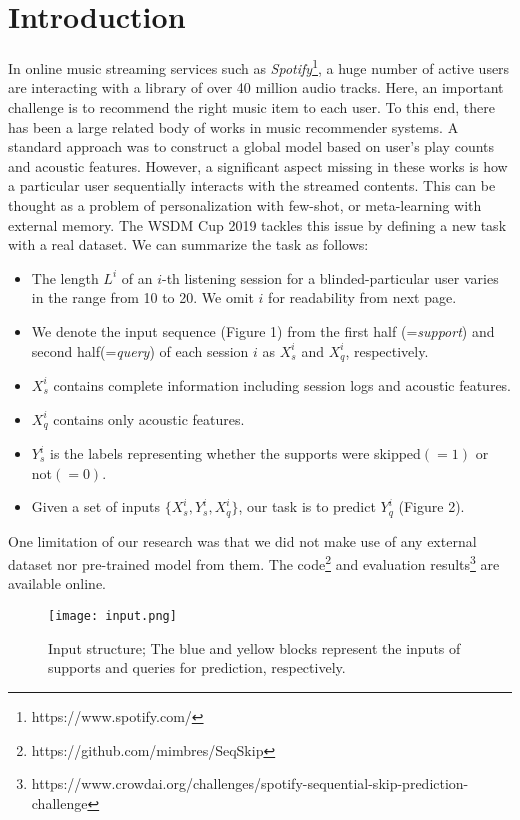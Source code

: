 
\section{Introduction}
In online music streaming services such as {\it Spotify}\footnote{https://www.spotify.com/}, a huge number of active users are interacting with a library of over 40 million audio tracks. Here, an important challenge is to recommend the right music item to each user. To this end, there has  been a large related body of works in music recommender systems. A standard approach was to construct a global model based on user's play counts\cite{celma2010music, van2013deep} and acoustic features\cite{van2013deep}. However, a significant aspect missing in these works is how a particular user sequentially interacts with the streamed contents. This can be thought as a problem of  personalization\cite{cho2002personalized} with few-shot, or meta-learning\cite{snail} with external memory\cite{santoro2016meta}. The WSDM Cup 2019 tackles this issue by defining a new task with a real dataset\cite{brost2019music}. We can summarize the task as follows:
\begin{itemize}
\item The length $L^i$ of an $i$-th listening session for a blinded-particular user varies in the range from 10 to 20. We omit $i$ for readability from next page.
\item We denote the input sequence (Figure 1) from the first half (={\it support}) and second half(={\it query}) of each session $i$ as $X^i_s$ and  $X^i_q$, respectively.
\item $X^i_s$ contains complete information including session logs and acoustic features.
\item $X^i_q$ contains only acoustic features.
\item $Y^i_s$ is the labels representing whether the supports were skipped$(=1)$ or not$(=0)$.
\item Given a set of inputs $\{X^i_s, Y^i_s, X^i_q\}$, our task is to predict $Y^i_q$ (Figure 2).
\end{itemize}

One limitation of our research was that we did not make use of any external dataset nor pre-trained model from them. The code\footnote{https://github.com/mimbres/SeqSkip} and evaluation results\footnote{https://www.crowdai.org/challenges/spotify-sequential-skip-prediction-challenge} are available online.

\begin{figure*}
\texttt{[image: input.png]}
\caption{Input structure; The blue and yellow blocks represent the inputs of supports and queries for prediction, respectively.}
\end{figure*}


